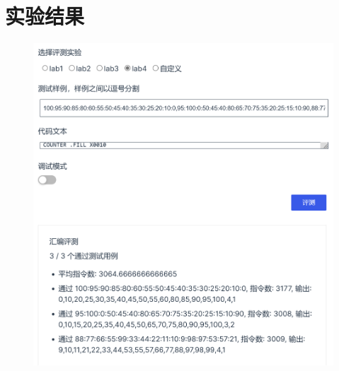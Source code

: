 \documentclass[UTF8]{ctexart}
\begin{document}
\section{实验结果}
    \begin{figure}[htbp]
        \centering
        \includegraphics[scale=0.8]{r.png}
    \end{figure}
\end{document}
